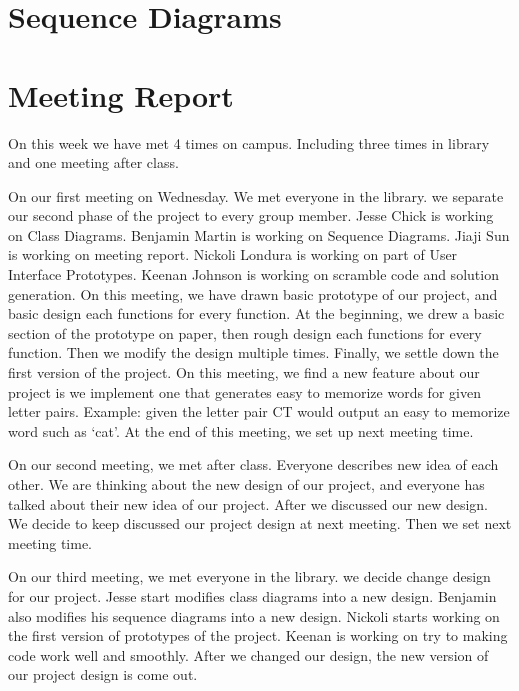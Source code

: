 \documentclass[12pt]{article}
\begin{document}
\section{Sequence Diagrams}

\section{Meeting Report}

\par
On this week we have met 4 times on campus. Including three times in library and one meeting after class. \\

\par
On our first meeting on Wednesday. We met everyone in the library. we separate our second phase of the project to every group member. Jesse Chick is working on Class Diagrams. Benjamin Martin is working on Sequence Diagrams. Jiaji Sun is working on meeting report. Nickoli Londura is working on part of User Interface Prototypes. Keenan Johnson is working on scramble code and solution generation. On this meeting, we have drawn basic prototype of our project, and basic design each functions for every function. At the beginning, we drew a basic section of the prototype on paper, then rough design each functions for every function. Then we modify the design multiple times. Finally, we settle down the first version of the project. On this meeting, we find a new feature about our project is we implement one that generates easy to memorize words for given letter pairs. Example: given the letter pair CT would output an easy to memorize word such as ‘cat’. At the end of this meeting, we set up next meeting time. \\

\par
On our second meeting, we met after class. Everyone describes new idea of each other. We are thinking about the new design of our project, and everyone has talked about their new idea of our project. After we discussed our new design. We decide to keep discussed our project design at next meeting. Then we set next meeting time. \\

\par
On our third meeting, we met everyone in the library. we decide change design for our project. Jesse start modifies class diagrams into a new design. Benjamin also modifies his sequence diagrams into a new design. Nickoli starts working on the first version of prototypes of the project. Keenan is working on try to making code work well and smoothly. After we changed our design, the new version of our project design is come out. \\
\end{document}
